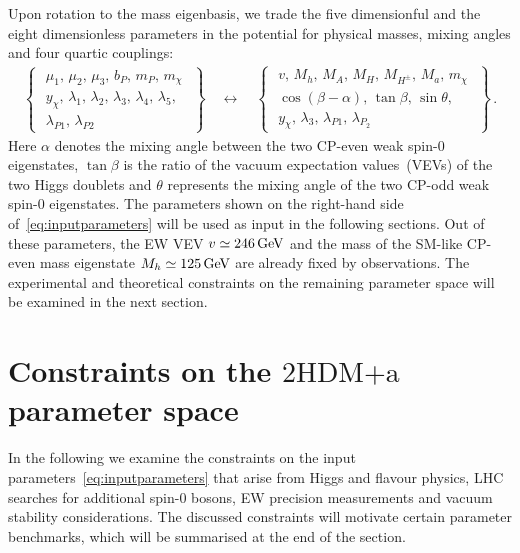 \documentclass[a4paper, 11pt,notoc]{article}
\newcommand{\hdma}{\ensuremath{\textrm{2HDM+a}}\xspace}
\begin{document}
Upon rotation to the mass eigenbasis, we trade the five dimensionful and the eight dimensionless parameters in the potential for physical masses, mixing angles and four quartic couplings:
\begin{align} \label{eq:inputparameters}
\left\{ \,\,\begin{matrix}
\mu_1,\,\mu_2,\,\mu_3,\,b_P,\,m_P,\,m_\chi\\[3pt]
y_\chi,\,\lambda_1,\,\lambda_2,\,\lambda_3,\,\lambda_4,\,\lambda_5,\\
\lambda_{P1},\,\lambda_{P2}
\end{matrix}\,\,\right\}\quad  \longleftrightarrow  \quad \left\{ \,\,\begin{matrix}
v,\,M_h,\,M_A,\,M_H,\,M_{H^\pm},\,M_a,\,m_\chi \\[3pt]
\cos(\beta-\alpha),\,\tan \beta,\,\sin  \theta,\\[3pt]
y_\chi,\,\lambda_3,\,\lambda_{P1},\,\lambda_{P_2}
\end{matrix}\,\,\right\}\,.
\end{align}
Here $\alpha$ denotes the mixing angle between the two CP-even weak spin-0 eigenstates, $\tan \beta$ is the ratio of the vacuum expectation values~(VEVs) of the two Higgs doublets and $\theta$ represents the mixing angle of the two CP-odd weak spin-0 eigenstates. The parameters shown on the right-hand side of~\eqref{eq:inputparameters} will be used as input in the following sections. Out of these  parameters, the EW VEV $v \simeq 246 \, {\rm GeV}$ and the mass of the SM-like CP-even mass eigenstate $M_h \simeq 125 \, {\rm GeV}$ are already fixed by observations. The experimental and theoretical constraints on the remaining parameter space will be examined in the next section. 


\section{Constraints on the \hdma parameter space}
\label{sec:constraints}

In the following we examine the constraints on the input parameters~\eqref{eq:inputparameters} that arise from Higgs and flavour physics, LHC searches for additional spin-0 bosons, EW precision measurements and vacuum stability considerations. The discussed constraints will motivate certain parameter benchmarks, which will be summarised at the end of the section. 
\end{document}
